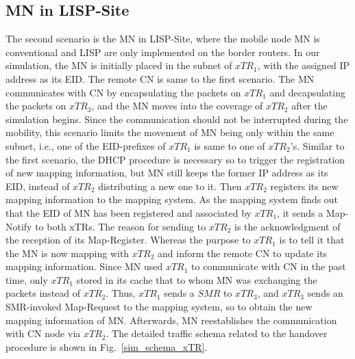 \subsection{MN in LISP-Site}
\label{sec:ns3_analysis_xTR}
The second scenario is the MN in LISP-Site, where the mobile node MN is conventional and LISP are only implemented on the border routers. In our simulation, the MN is initially placed in the subnet of $xTR_1$, with the assigned IP address as its EID. The remote CN is same to the first scenario. The MN communicates with CN by encapsulating the packets on $xTR_1$ and decapsulating the packets on $xTR_3$, and the MN moves into the coverage of $xTR_2$ after the simulation begins. Since the communication should not be interrupted during the mobility, this scenario limits the movement of MN being only within the same subnet, i.e., one of the EID-prefixes of $xTR_1$ is same to one of $xTR_2$'s. %
Similar to the first scenario, the DHCP procedure is necessary so to trigger the registration of new mapping information, but MN still keeps the former IP address as its EID, instead of $xTR_2$ distributing a new one to it. Then $xTR_2$ registers its new mapping information to the mapping system. As the mapping system finds out that the EID of MN has been registered and associated by $xTR_1$, it sends a Map-Notify to both xTRs. The reason for sending to $xTR_2$ is the acknowledgment of the reception of its Map-Register. Whereas the purpose to $xTR_1$ is to tell it that the MN is now mapping with $xTR_2$ and inform the remote CN to update its mapping information. Since MN used $xTR_1$ to communicate with CN in the past time, only $xTR_1$ stored in its cache that to whom MN was exchanging the packets instead of $xTR_2$. Thus, $xTR_1$ sends a $SMR$ to $xTR_3$, and $xTR_3$ sends an SMR-invoked Map-Request to the mapping system, so to obtain the new mapping information of MN. Afterwards, MN reestablishes the communication with CN node via $xTR_2$. The detailed traffic schema related to the handover procedure is shown in Fig.~\ref{sim_schema_xTR}.
